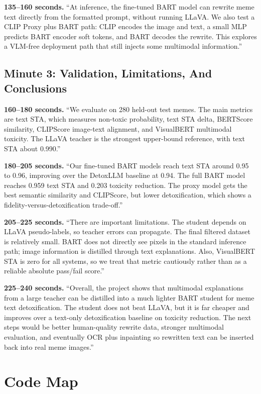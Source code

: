 \documentclass[11pt,a4paper]{article}
\begin{document}
\textbf{135--160 seconds.}
``At inference, the fine-tuned BART model can rewrite meme text directly from the formatted prompt, without running LLaVA. We also test a CLIP Proxy plus BART path: CLIP encodes the image and text, a small MLP predicts BART encoder soft tokens, and BART decodes the rewrite. This explores a VLM-free deployment path that still injects some multimodal information.''

\subsection*{Minute 3: Validation, Limitations, And Conclusions}

\textbf{160--180 seconds.}
``We evaluate on 280 held-out test memes. The main metrics are text STA, which measures non-toxic probability, text STA delta, BERTScore similarity, CLIPScore image-text alignment, and VisualBERT multimodal toxicity. The LLaVA teacher is the strongest upper-bound reference, with text STA about 0.990.''

\textbf{180--205 seconds.}
``Our fine-tuned BART models reach text STA around 0.95 to 0.96, improving over the DetoxLLM baseline at 0.94. The full BART model reaches 0.959 text STA and 0.203 toxicity reduction. The proxy model gets the best semantic similarity and CLIPScore, but lower detoxification, which shows a fidelity-versus-detoxification trade-off.''

\textbf{205--225 seconds.}
``There are important limitations. The student depends on LLaVA pseudo-labels, so teacher errors can propagate. The final filtered dataset is relatively small. BART does not directly see pixels in the standard inference path; image information is distilled through text explanations. Also, VisualBERT STA is zero for all systems, so we treat that metric cautiously rather than as a reliable absolute pass/fail score.''

\textbf{225--240 seconds.}
``Overall, the project shows that multimodal explanations from a large teacher can be distilled into a much lighter BART student for meme text detoxification. The student does not beat LLaVA, but it is far cheaper and improves over a text-only detoxification baseline on toxicity reduction. The next steps would be better human-quality rewrite data, stronger multimodal evaluation, and eventually OCR plus inpainting so rewritten text can be inserted back into real meme images.''

\section{Code Map}
\end{document}
